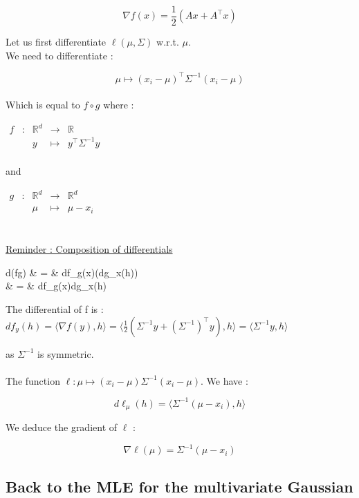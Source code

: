 \documentclass[12pt]{report}	%
\begin{document}
$$\nabla f(x) = \frac{1}{2}\left(Ax + A^{\top}x \right)$$

Let us first differentiate $\ell\left( \mu, \Sigma \right)$ w.r.t. $\mu$.\\

We need to differentiate : 

$$\mu\mapsto (x_{i}-\mu)^{\top}\Sigma^{-1}(x_{i}-\mu)$$
~\\
Which is equal to $f \circ g$ where :\\

\begin{center}
$\begin{array}{ccccc}
f & : & \mathbb{R}^{d} & \to & \mathbb{R} \\
  &   & y & \mapsto & y^{\top}\Sigma^{-1}y \\
\end{array}$
\end{center}
and 

\begin{center}
$\begin{array}{ccccc}
g & : & \mathbb{R}^{d} & \to & \mathbb{R}^{d} \\
  &   & \mu & \mapsto & \mu - x_{i} \\
\end{array}$
\end{center}
~\\
\underline{Reminder : Composition of differentials}

\BEAS
d(f\circ g) & = & df_{g(x)}\left(dg_{x}(h)\right) \\ 
						& = & df_{g(x)}\circ dg_{x}(h) 								 
\EEAS

The differential of f is : $df_{y}(h) = \langle\nabla f(y),h\rangle = \langle\frac{1}{2}\left(\Sigma^{-1}y+\left(\Sigma^{-1}\right)^{\top}y\right),h\rangle = \langle\Sigma^{-1}y,h\rangle$

as $\Sigma^{-1}$ is symmetric.\\
~\\
The function $\ell : \mu\mapsto (x_{i}-\mu)\Sigma^{-1}(x_{i}-\mu)$. We have : 

$$d\ell_{\mu}(h) = \langle \Sigma^{-1}(\mu - x_{i}), h \rangle$$

We deduce the gradient of $\ell$ : 

$$\nabla\ell(\mu) = \Sigma^{-1}(\mu - x_{i})$$

\subsection{Back to the MLE for the multivariate Gaussian }
\end{document}
